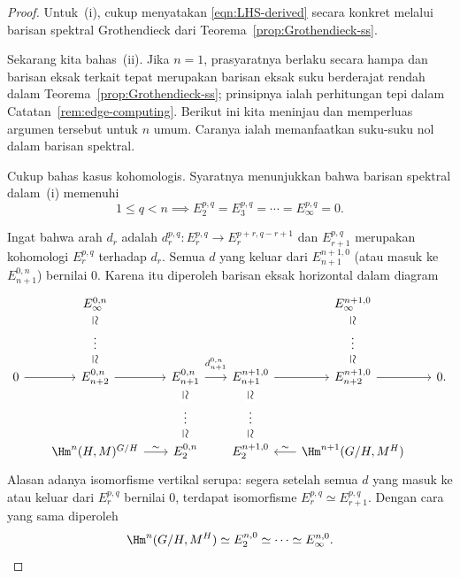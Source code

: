 
\begin{proof}
	Untuk~(i), cukup menyatakan \eqref{eqn:LHS-derived} secara konkret melalui
	barisan spektral Grothendieck dari Teorema~\ref{prop:Grothendieck-ss}.

	Sekarang kita bahas~(ii). Jika $n=1$, prasyaratnya berlaku secara hampa dan
	barisan eksak terkait tepat merupakan barisan eksak suku berderajat rendah
	dalam Teorema~\ref{prop:Grothendieck-ss}; prinsipnya ialah perhitungan tepi
	dalam Catatan~\ref{rem:edge-computing}. Berikut ini kita meninjau dan
	memperluas argumen tersebut untuk $n$ umum. Caranya ialah memanfaatkan
	suku-suku nol dalam barisan spektral.

	Cukup bahas kasus kohomologis. Syaratnya menunjukkan bahwa barisan spektral
	dalam~(i) memenuhi
	\[ 1\leq q<n\implies
	E_2^{p,q}=E_3^{p,q}=\cdots=E_\infty^{p,q}=0. \]

	Ingat bahwa arah $d_r$ adalah
	$d_r^{p,q}:E_r^{p,q}\to E_r^{p+r,q-r+1}$ dan $E_{r+1}^{p,q}$ merupakan
	kohomologi $E_r^{p,q}$ terhadap $d_r$. Semua $d$ yang keluar dari
	$E_{n+1}^{n+1,0}$ (atau masuk ke $E_{n+1}^{0,n}$) bernilai $0$. Karena itu
	diperoleh barisan eksak horizontal dalam diagram
	\[\begin{tikzcd}[row sep=small, column sep=scriptsize]
		& E_\infty^{0,n} \arrow[phantom,d,"\simeq" description,sloped]
		& & & E_\infty^{n+1,0}
		\arrow[phantom,d,"\simeq" description,sloped] & \\
		& \vdots \arrow[phantom,d,"\simeq" description,sloped]
		& & & \vdots \arrow[phantom,d,"\simeq" description,sloped] & \\
		0 \arrow[r] & E_{n+2}^{0,n} \arrow[r] &
		E_{n+1}^{0,n} \arrow[r,"{d^{0,n}_{n+1}}" inner sep=0.6em]
		\arrow[phantom,d,"\simeq" description,sloped] &
		E_{n+1}^{n+1,0} \arrow[r]
		\arrow[phantom,d,"\simeq" description,sloped] &
		E_{n+2}^{n+1,0} \arrow[r] & 0. \\
		& & \vdots \arrow[phantom,d,"\simeq" description,sloped] &
		\vdots \arrow[phantom,d,"\simeq" description,sloped] & & \\
		& \Hm^n(H,M)^{G/H} \arrow[r,"\sim"] & E_2^{0,n} & E_2^{n+1,0} &
		\Hm^{n+1}(G/H,M^H) \arrow[l,"\sim"'] &
	\end{tikzcd}\]
	Alasan adanya isomorfisme vertikal serupa: segera setelah semua $d$ yang
	masuk ke atau keluar dari $E_r^{p,q}$ bernilai $0$, terdapat isomorfisme
	$E_r^{p,q}\simeq E_{r+1}^{p,q}$. Dengan cara yang sama diperoleh
	\[ \Hm^n(G/H,M^H)\simeq E_2^{n,0}\simeq\cdots
	\simeq E_\infty^{n,0}. \]


\end{proof}

